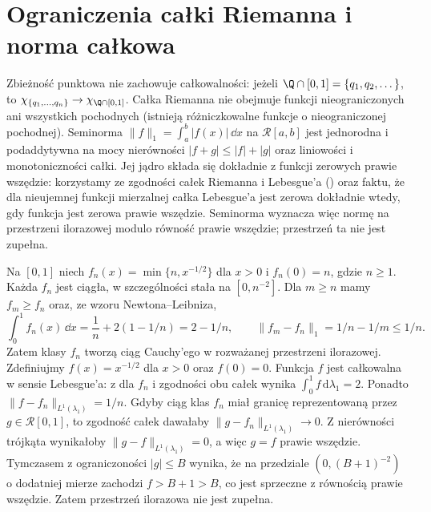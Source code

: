 \section{Ograniczenia całki Riemanna i norma całkowa}
\begin{uwaga}
Zbieżność punktowa nie zachowuje całkowalności: jeżeli $\Q\cap[0,1]=\{q_1,q_2,\dots\}$, to $\chi_{\{q_1,\dots,q_n\}}\to\chi_{\Q\cap[0,1]}$. Całka Riemanna nie obejmuje funkcji nieograniczonych ani wszystkich pochodnych (istnieją różniczkowalne funkcje o nieograniczonej pochodnej). Seminorma $\|f\|_1=\int_a^b|f(x)|\,\dd x$ na $\mathcal R[a,b]$ jest jednorodna i podaddytywna na mocy nierówności $|f+g|\le|f|+|g|$ oraz liniowości i monotoniczności całki. Jej jądro składa się dokładnie z funkcji zerowych prawie wszędzie: korzystamy ze zgodności całek Riemanna i Lebesgue'a () oraz faktu, że dla nieujemnej funkcji mierzalnej całka Lebesgue'a jest zerowa dokładnie wtedy, gdy funkcja jest zerowa prawie wszędzie. Seminorma wyznacza więc normę na przestrzeni ilorazowej modulo równość prawie wszędzie; przestrzeń ta nie jest zupełna.
\end{uwaga}
\begin{przyklad}
Na $[0,1]$ niech $f_n(x)=\min\{n,x^{-1/2}\}$ dla $x>0$ i $f_n(0)=n$, gdzie $n\ge1$. Każda $f_n$ jest ciągła, w szczególności stała na $[0,n^{-2}]$. Dla $m\ge n$ mamy $f_m\ge f_n$ oraz, ze wzoru Newtona--Leibniza,
\[
 \int_0^1 f_n(x)\,\dd x=\frac1n+2(1-1/n)=2-1/n,
 \qquad
 \|f_m-f_n\|_1=1/n-1/m\le 1/n.
\]
Zatem klasy $f_n$ tworzą ciąg Cauchy'ego w rozważanej przestrzeni ilorazowej. Zdefiniujmy $f(x)=x^{-1/2}$ dla $x>0$ oraz $f(0)=0$. Funkcja $f$ jest całkowalna w sensie Lebesgue'a: z  dla $f_n$ i zgodności obu całek wynika $\int_0^1 f\,\mathrm d\lambda_1=2$. Ponadto $\|f-f_n\|_{L^1(\lambda_1)}=1/n$. Gdyby ciąg klas $f_n$ miał granicę reprezentowaną przez $g\in\mathcal R[0,1]$, to zgodność całek dawałaby $\|g-f_n\|_{L^1(\lambda_1)}\to0$. Z nierówności trójkąta wynikałoby $\|g-f\|_{L^1(\lambda_1)}=0$, a więc $g=f$ prawie wszędzie. Tymczasem z ograniczoności $|g|\le B$ wynika, że na przedziale $(0,(B+1)^{-2})$ o dodatniej mierze zachodzi $f>B+1>B$, co jest sprzeczne z równością prawie wszędzie. Zatem przestrzeń ilorazowa nie jest zupełna.
\end{przyklad}
